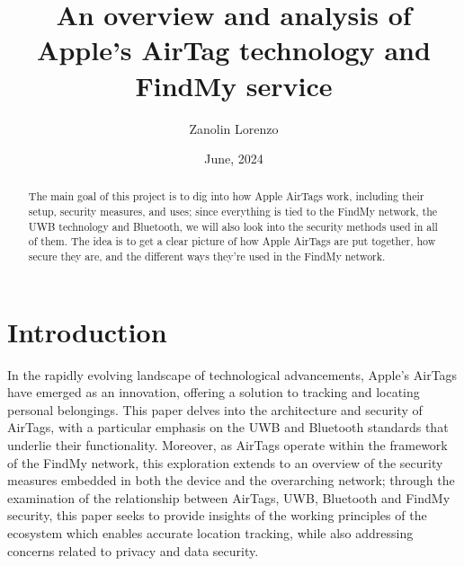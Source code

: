 \documentclass[english]{article}
\title{An overview and analysis of Apple’s AirTag technology and FindMy service}
\author{Zanolin Lorenzo}
\date{June, 2024}
\begin{document}
\maketitle

\tableofcontents
\newpage


\begin{abstract}
  The main goal of this project is to dig into how Apple AirTags work, including their setup, security measures, and uses; since everything is tied to the FindMy network, the UWB technology and Bluetooth, we will also look into the security methods used in all of them. The idea is to get a clear picture of how Apple AirTags are put together, how secure they are, and the different ways they're used in the FindMy network.
\end{abstract}

\section{Introduction}\label{sec:intro}
In the rapidly evolving landscape of technological advancements, Apple's AirTags have emerged as an innovation, offering a solution to tracking and locating personal belongings. This paper delves into the architecture and security of AirTags, with a particular emphasis on the UWB and Bluetooth standards that underlie their functionality. Moreover, as AirTags operate within the framework of the FindMy network, this exploration extends to an overview of the security measures embedded in both the device and the overarching network; through the examination of the relationship between AirTags, UWB, Bluetooth and FindMy security, this paper seeks to provide insights of the working principles of the ecosystem which enables accurate location tracking, while also addressing concerns related to privacy and data security.

\end{document}
